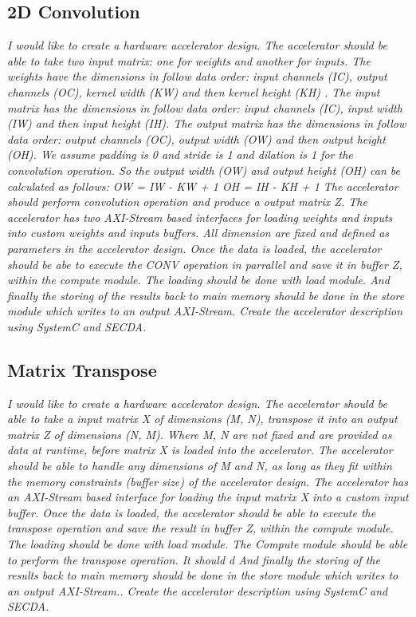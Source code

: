 \subsection{2D Convolution}
\emph{
I would like to create a hardware accelerator design.
The accelerator should be able to take two input matrix: one for weights and another for inputs.
The weights have the dimensions in follow data order: input channels (IC), output channels (OC), kernel width (KW) and then kernel height (KH) .
The input matrix has the dimensions in follow data order: input channels (IC), input width (IW) and then input height (IH).
The output matrix has the dimensions in follow data order: output channels (OC), output width (OW) and then output height (OH).
We assume padding is 0 and stride is 1 and dilation is 1 for the convolution operation.
So the output width (OW) and output height (OH) can be calculated as follows:
OW = IW - KW + 1
OH = IH - KH + 1
The accelerator should perform convolution operation and produce a output matrix Z.
The accelerator has two AXI-Stream based interfaces for loading weights and inputs into custom weights and inputs buffers.
All dimension are fixed and defined as parameters in the accelerator design.
Once the data is loaded, the accelerator should be abe to execute the CONV operation in parrallel and save it in buffer Z, within the compute module.
The loading should be done with load module.
And finally the storing of the results back to main memory should be done in the store module which writes to an output AXI-Stream.
Create the accelerator description using SystemC and SECDA.
}

\subsection{Matrix Transpose}
\emph{
I would like to create a hardware accelerator design.
The accelerator should be able to take a input matrix X of dimensions (M, N), transpose it into an output matrix Z of dimensions (N, M).
Where M, N are not fixed and are provided as data at runtime, before matrix X is loaded into the accelerator. The accelerator should be able to handle any dimensions of M and N, as long as they fit within the memory constraints (buffer size) of the accelerator design.
The accelerator has an AXI-Stream based interface for loading the input matrix X into a custom input buffer.
Once the data is loaded, the accelerator should be able to execute the transpose operation and save the result in buffer Z, within the compute module.
The loading should be done with load module.
The Compute module should be able to perform the transpose operation. It should d
And finally the storing of the results back to main memory should be done in the store module which writes to an output AXI-Stream..
Create the accelerator description using SystemC and SECDA.
}